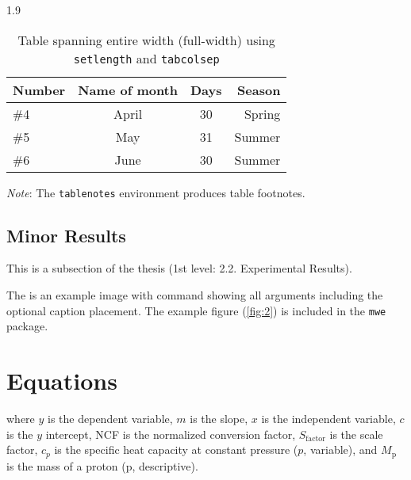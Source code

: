 \documentclass[ms-thesis,12pt,chapterrefs]{ndsu-thesis-2022}
\newcommand\myspacing{1.9} %
\begin{document}
\begin{spacing}{\myspacing}
\begin{table}[ht]
\centering
\caption{Table spanning entire width (full-width) using \texttt{setlength} and
\texttt{tabcolsep}}
\vspace{-1ex}
\setlength{\tabcolsep}{3.75em}
\begin{tabular}{@{\hspace{2ex}} lccr @{\hspace{2ex}}}
\toprule
Number & Name of month & Days & Season\\
\midrule
\#4 	& April  & 30		& Spring\\
\#5 	& May    & 31		& Summer\\
\#6 	& June   & 30		& Summer\\
\bottomrule
\end{tabular}
\begin{tablenotes}[flushleft]
\footnotesize
\item \hspace{-1ex} \emph{Note}: The \texttt{tablenotes} environment produces table footnotes. 
\end{tablenotes}
\label{tab:2}
\end{table}	\kant[7-8]

\subsection{Minor Results}
This is a subsection of the thesis (1st level: 2.2. Experimental Results). 	

\kant[8]
The  is an example image with command showing all arguments including the optional caption placement. The example figure (\cref{fig:2}) is included in the \texttt{mwe} package.

\kant[8]

\section{Equations}
\kant[2]


\noindent where $y$ is the dependent variable, $m$ is the slope, $x$ is the independent variable, $c$ is the $y$ intercept, NCF is the normalized conversion factor, $S_\text{factor}$ is the scale factor, $c_p$ is the specific heat capacity at constant pressure ($p$, variable), and $M_\text{p}$ is the mass of a proton (p, descriptive). 


\end{spacing}
\end{document}
